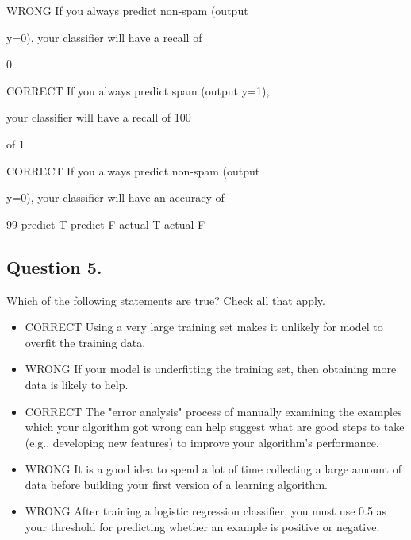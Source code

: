\documentclass[11pt]{article} %
\begin{document}
WRONG If you always predict non-spam (output

y=0), your classifier will have a recall of

0%


CORRECT If you always predict spam (output y=1),

your classifier will have a recall of 100%

of 1%



CORRECT If you always predict non-spam (output

y=0), your classifier will have an accuracy of

99%
             predict T	predict F
actual T	
actual F

\subsection*{Question 5.}

Which of the following statements are true? Check all that apply.

\begin{itemize}
\item CORRECT Using a very large training set makes it unlikely for model to overfit the training data.
	
	
\item 	WRONG If your model is underfitting the training set, then obtaining more data is likely to help.
	
\item 	CORRECT The "error analysis" process of manually examining the examples which your algorithm got wrong	can help suggest what are good steps to take (e.g., developing new features) to improve your algorithm's performance.
	
	
	
\item	WRONG It is a good idea to spend a lot of time collecting a large amount of data before building your first version of a learning algorithm.
	
	
	
\item WRONG After training a logistic regression classifier, you must use 0.5 as your threshold for predicting whether an example is positive or	negative.
\end{itemize}
\end{document}
